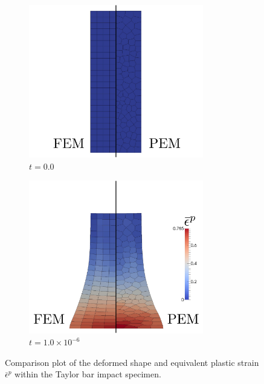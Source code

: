 \begin{figure}[!h]
  \centering
    \begin{subfigure}[b]{0.49\linewidth}
            \centering
            \includegraphics[width=3.0in]{figures/taylor_eqps_0.pdf}
    			\caption{$t=0.0$ \label{fig:taylor_eqps_0}}
    \end{subfigure}
	\begin{subfigure}[b]{0.49\linewidth}
            \centering
            \includegraphics[width=3.0in]{figures/taylor_eqps_1.pdf}
    			\caption{$t=1.0\times 10^{-6}$ \label{fig:taylor_eqps_1}}
    \end{subfigure} \caption{Comparison plot of the deformed shape and equivalent plastic strain $\bar{\epsilon}^p$ within the Taylor bar impact specimen.}
  \label{fig:taylor_eqps}
\end{figure}